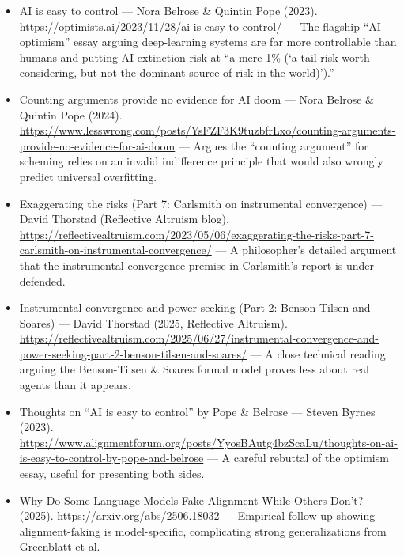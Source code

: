 \documentclass[11pt]{article}
\begin{document}
\begin{itemize}
  \item AI is easy to control --- Nora Belrose \& Quintin Pope (2023). \url{https://optimists.ai/2023/11/28/ai-is-easy-to-control/} --- The flagship ``AI optimism'' essay arguing deep-learning systems are far more controllable than humans and putting AI extinction risk at ``a mere 1\% (`a tail risk worth considering, but not the dominant source of risk in the world)').''
  \item Counting arguments provide no evidence for AI doom --- Nora Belrose \& Quintin Pope (2024). \url{https://www.lesswrong.com/posts/YsFZF3K9tuzbfrLxo/counting-arguments-provide-no-evidence-for-ai-doom} --- Argues the ``counting argument'' for scheming relies on an invalid indifference principle that would also wrongly predict universal overfitting.
  \item Exaggerating the risks (Part 7: Carlsmith on instrumental convergence) --- David Thorstad (Reflective Altruism blog). \url{https://reflectivealtruism.com/2023/05/06/exaggerating-the-risks-part-7-carlsmith-on-instrumental-convergence/} --- A philosopher's detailed argument that the instrumental convergence premise in Carlsmith's report is under-defended.
  \item Instrumental convergence and power-seeking (Part 2: Benson-Tilsen and Soares) --- David Thorstad (2025, Reflective Altruism). \url{https://reflectivealtruism.com/2025/06/27/instrumental-convergence-and-power-seeking-part-2-benson-tilsen-and-soares/} --- A close technical reading arguing the Benson-Tilsen \& Soares formal model proves less about real agents than it appears.
  \item Thoughts on ``AI is easy to control'' by Pope \& Belrose --- Steven Byrnes (2023). \url{https://www.alignmentforum.org/posts/YyosBAutg4bzScaLu/thoughts-on-ai-is-easy-to-control-by-pope-and-belrose} --- A careful rebuttal of the optimism essay, useful for presenting both sides.
  \item Why Do Some Language Models Fake Alignment While Others Don't? --- (2025). \url{https://arxiv.org/abs/2506.18032} --- Empirical follow-up showing alignment-faking is model-specific, complicating strong generalizations from Greenblatt et al.
\end{itemize}



\end{document}
